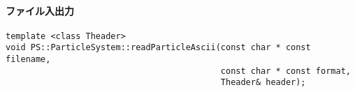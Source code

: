 
\paragraph{ファイル入出力}
\mbox{}

\begin{screen}
\begin{verbatim}
template <class Theader>
void PS::ParticleSystem::readParticleAscii(const char * const filename,
                                           const char * const format,
                                           Theader& header);
\end{verbatim}
\end{screen}

